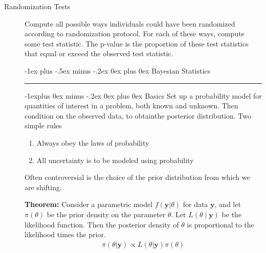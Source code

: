 \documentclass[10pt,landscape]{article}
\makeatletter
\renewcommand\vec{\mathbf}
\renewcommand{\section}{\@startsection{section}{1}{0mm}%
                                {-1ex plus -.5ex minus -.2ex}%
                                {0ex plus 0ex}%
                                {\normalfont\medium\bfseries}}
\renewcommand{\subsection}{\@startsection{subsection}{2}{0mm}%
                                {-1explus 0ex minus -.2ex}%
                                {0ex plus 0ex}%
                                {\normalfont\small\bfseries}}
\makeatother
\begin{document}
\begin{multicols*}{3}
\begin{description}
\item[Randomization Tests]
Compute all possible ways individuals could have been randomized according to randomization protocol. For each of these ways, compute some test statistic. The p-value is the proportion of these test statistics that equal or exceed the observed test statistic. 


\section{Bayesian Statistics} \hrule height 1pt
\subsection{Basics}
Set up a probability model for quantities of interest in a problem, both  known and unknown. Then condition on the observed data, to  obtainthe posterior distribution. Two simple rules
\begin{enumerate}
    \item Always obey the laws of probability
    \item All uncertainty is to be modeled using probability
\end{enumerate}
Often controversial is the choice of the prior distribution from which we are shifting.

\textbf{Theorem: } Consider a parametric model $f(\vec{y} | \theta)$ for data $\vec{y}$, and let $\pi(\theta)$ be the prior density on the parameter $\theta$. Let $L(\theta \mid \vec{y})$ be the likelihood function. Then the posterior density of $\theta$ is proportional to the likelihood times the prior.
\begin{align*}
    \pi(\theta|\vec{y}) \propto L(\theta|\vec{y}) \pi(\theta)
\end{align*}


\end{description}
\end{multicols*}
\end{document}
